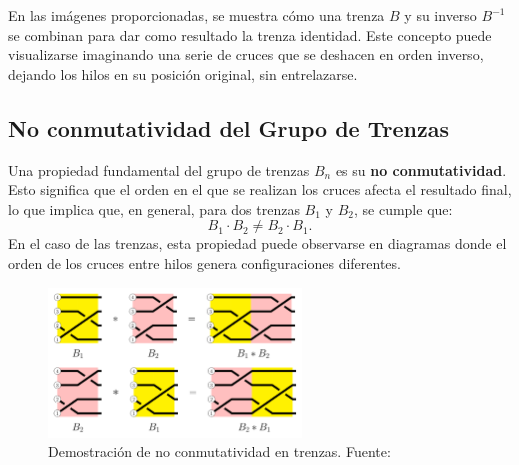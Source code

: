 En las imágenes proporcionadas, se muestra cómo una trenza \( B \) y su inverso \( B^{-1} \) se combinan para dar como resultado la trenza identidad. Este concepto puede visualizarse imaginando una serie de cruces que se deshacen en orden inverso, dejando los hilos en su posición original, sin entrelazarse.



\subsection{No conmutatividad del Grupo de Trenzas}

Una propiedad fundamental del grupo de trenzas \( B_n \) es su \textbf{no conmutatividad}. Esto significa que el orden en el que se realizan los cruces afecta el resultado final, lo que implica que, en general, para dos trenzas \( B_1 \) y \( B_2 \), se cumple que:
\[
B_1 \cdot B_2 \neq B_2 \cdot B_1.
\]
En el caso de las trenzas, esta propiedad puede observarse en diagramas donde el orden de los cruces entre hilos genera configuraciones diferentes.

\begin{figure}[h!]
    \centering
    \includegraphics[width=0.6\textwidth]{figures/chapters/1_def_grupo/no_conmutativa.png}
    \caption{Demostración de no conmutatividad en trenzas. Fuente: \cite{ArithmeticBraids}}
    \label{fig:elemento_inverso_proceso}
\end{figure}


